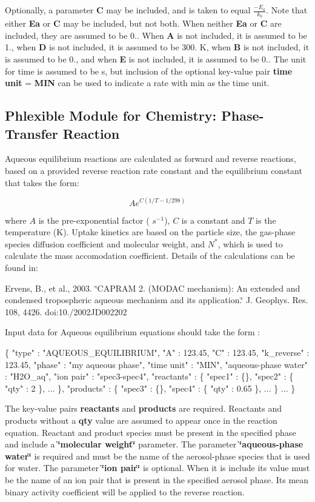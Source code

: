 Optionally, a parameter {\bfseries C} may be included, and is taken to equal $\frac{-E_a}{k_b}$. Note that either {\bfseries Ea} or {\bfseries C} may be included, but not both. When neither {\bfseries Ea} or {\bfseries C} are included, they are assumed to be 0.. When {\bfseries A} is not included, it is assumed to be 1., when {\bfseries D} is not included, it is assumed to be 300. K, when {\bfseries B} is not included, it is assumed to be 0., and when {\bfseries E} is not included, it is assumed to be 0.. The unit for time is assumed to be s, but inclusion of the optional key-\/value pair {\bfseries time} {\bfseries unit} = {\bfseries M\+IN} can be used to indicate a rate with min as the time unit. \hypertarget{phlex_rxn_aqueous_equilibrium}{}\subsection{Phlexible Module for Chemistry\+: Phase-\/\+Transfer Reaction}\label{phlex_rxn_aqueous_equilibrium}
Aqueous equilibrium reactions are calculated as forward and reverse reactions, based on a provided reverse reaction rate constant and the equilibrium constant that takes the form\+:

\[ Ae^{C({1/T-1/298})} \]

where $A$ is the pre-\/exponential factor ( $s^{-1}$), $C$ is a constant and $T$ is the temperature (K). Uptake kinetics are based on the particle size, the gas-\/phase species diffusion coefficient and molecular weight, and $N^{*}$, which is used to calculate the mass accomodation coefficient. Details of the calculations can be found in\+:

Ervens, B., et al., 2003. \char`\"{}\+C\+A\+P\+R\+A\+M 2. (\+M\+O\+D\+A\+C mechanism)\+: An extended
 and condensed tropospheric aqueous mechanism and its application.\char`\"{} J. Geophys. Res. 108, 4426. doi\+:10./2002\+J\+D002202

Input data for Aqueous equilibrium equations should take the form \+: 
\begin{DoxyCode}
\{
  "type" : "AQUEOUS\_EQUILIBRIUM",
  "A" : 123.45,
  "C" : 123.45,
  "k\_reverse" : 123.45,
  "phase" : "my aqueous phase",
  "time unit" : "MIN",
  "aqueous-phase water" : "H2O\_aq",
  "ion pair" : "spec3-spec4",
  "reactants" : \{
    "spec1" : \{\},
    "spec2" : \{ "qty" : 2 \},
    ...
  \},
  "products" : \{
    "spec3" : \{\},
    "spec4" : \{ "qty" : 0.65 \},
    ...
  \}
  ...
\}
\end{DoxyCode}
 The key-\/value pairs {\bfseries reactants} and {\bfseries products} are required. Reactants and products without a {\bfseries qty} value are assumed to appear once in the reaction equation. Reactant and product species must be present in the specified phase and include a {\bfseries \char`\"{}molecular weight\char`\"{}} parameter. The parameter {\bfseries \char`\"{}aqueous-\/phase water\char`\"{}} is required and must be the name of the aerosol-\/phase species that is used for water. The parameter {\bfseries \char`\"{}ion pair\char`\"{}} is optional. When it is include its value must be the name of an ion pair that is present in the specified aerosol phase. Its mean binary activity coefficient will be applied to the reverse reaction.

